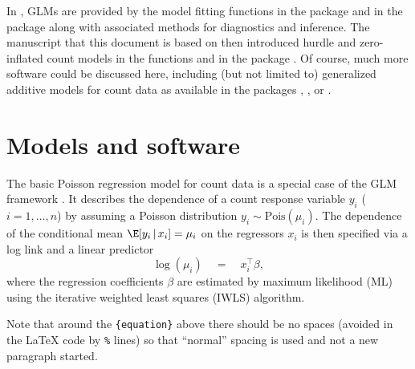 \documentclass[article]{jss}
\newcommand{\fct}[1]{\code{#1()}}
\begin{document}
In  \citep{R}, GLMs are provided by the model fitting functions
\fct{glm} in the  package and \fct{glm.nb} in the  package
\citep[][Chapter~7.4]{Venables+Ripley:2002} along with associated methods for
diagnostics and inference. The manuscript that this document is based on
\citep{Zeileis+Kleiber+Jackman:2008} then introduced hurdle and zero-inflated
count models in the functions \fct{hurdle} and \fct{zeroinfl} in the 
package \citep{Jackman:2015}. Of course, much more software could be discussed
here, including (but not limited to) generalized additive models for count data
as available in the  packages  \citep{Wood:2006}, 
 \citep{Stasinopoulos+Rigby:2007}, or  \citep{Yee:2009}.




\section{Models and software} \label{sec:models}

The basic Poisson regression model for count data is a special case of the GLM
framework \cite{McCullagh+Nelder:1989}. It describes the dependence of a count
response variable $y_i$ ($i = 1, \dots, n$) by assuming a Poisson distribution
$y_i \sim \mathrm{Pois}(\mu_i)$. The dependence of the conditional mean
$\E[y_i \, | \, x_i] = \mu_i$ on the regressors $x_i$ is then specified via a
log link and a linear predictor
%
\begin{equation} \label{eq:mean}
\log(\mu_i) \quad = \quad x_i^\top \beta,
\end{equation}
%
where the regression coefficients $\beta$ are estimated by maximum likelihood
(ML) using the iterative weighted least squares (IWLS) algorithm.

\begin{leftbar}
Note that around the \verb|{equation}| above there should be no spaces (avoided
in the {\LaTeX} code by \verb|%| lines) so that ``normal'' spacing is used and
not a new paragraph started.
\end{leftbar}
\end{document}
